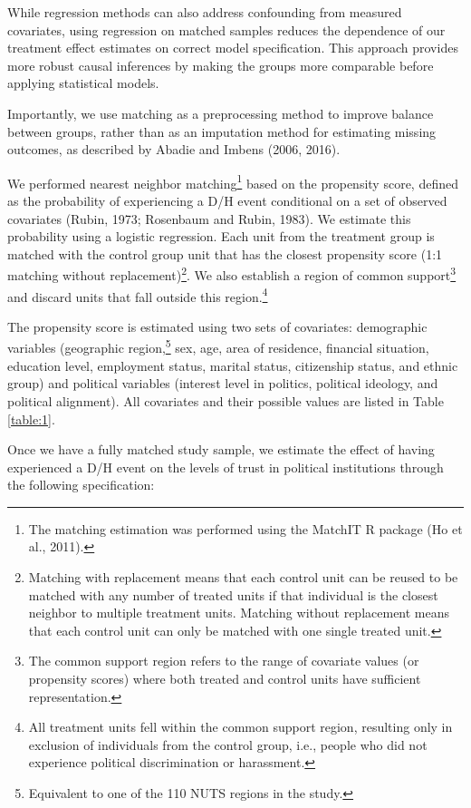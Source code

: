 \documentclass{article}
\begin{document}
While regression methods can also address confounding from measured covariates, using regression on matched samples reduces the dependence of our treatment effect estimates on correct model specification. This approach provides more robust causal inferences by making the groups more comparable before applying statistical models.

Importantly, we use matching as a preprocessing method to improve balance between groups, rather than as an imputation method for estimating missing outcomes, as described by Abadie and Imbens (2006, 2016).

We performed nearest neighbor matching\footnote{The matching estimation was performed using the MatchIT R package (Ho et al., 2011).} based on the propensity score, defined as the probability of experiencing a D/H event conditional on a set of observed covariates (Rubin, 1973; Rosenbaum and Rubin, 1983). We estimate this probability using a logistic regression. Each unit from the treatment group is matched with the control group unit that has the closest propensity score (1:1 matching without replacement)\footnote{Matching with replacement means that each control unit can be reused to be matched with any number of treated units if that individual is the closest neighbor to multiple treatment units. Matching without replacement means that each control unit can only be matched with one single treated unit.}. We also establish a region of common support\footnote{The common support region refers to the range of covariate values (or propensity scores) where both treated and control units have sufficient representation.} and discard units that fall outside this region.\footnote{All treatment units fell within the common support region, resulting only in exclusion of individuals from the control group, i.e., people who did not experience political discrimination or harassment.}

The propensity score is estimated using two sets of covariates: demographic variables (geographic region,\footnote{Equivalent to one of the 110 NUTS regions in the study.} sex, age, area of residence, financial situation, education level, employment status, marital status, citizenship status, and ethnic group) and political variables (interest level in politics, political ideology, and political alignment). All covariates and their possible values are listed in Table \ref{table:1}.

Once we have a fully matched study sample, we estimate the effect of having experienced a D/H event on the levels of trust in political institutions through the following specification:
\end{document}
